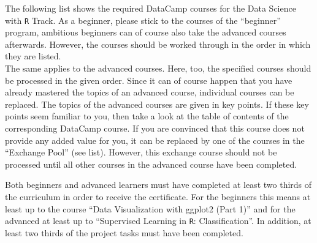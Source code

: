 \documentclass[
  11pt,
]{article}
\begin{document}
The following list shows the required DataCamp courses for the Data Science with \texttt{R} Track. As a beginner, please stick to the courses of the ``beginner'' program, ambitious beginners can of course also take the advanced courses afterwards. However, the courses should be worked through in the order in which they are listed.\\
The same applies to the advanced courses. Here, too, the specified courses should be processed in the given order. Since it can of course happen that you have already mastered the topics of an advanced course, individual courses can be replaced. The topics of the advanced courses are given in key points. If these key points seem familiar to you, then take a look at the table of contents of the corresponding DataCamp course. If you are convinced that this course does not provide any added value for you, it can be replaced by one of the courses in the ``Exchange Pool'' (see list). However, this exchange course should not be processed until all other courses in the advanced course have been completed.

Both beginners and advanced learners must have completed at least two thirds of the curriculum in order to receive the certificate. For the beginners this means at least up to the course ``Data Visualization with ggplot2 (Part 1)'' and for the advanced at least up to ``Supervised Learning in \texttt{R}: Classification''. In addition, at least two thirds of the project tasks must have been completed.
\end{document}

